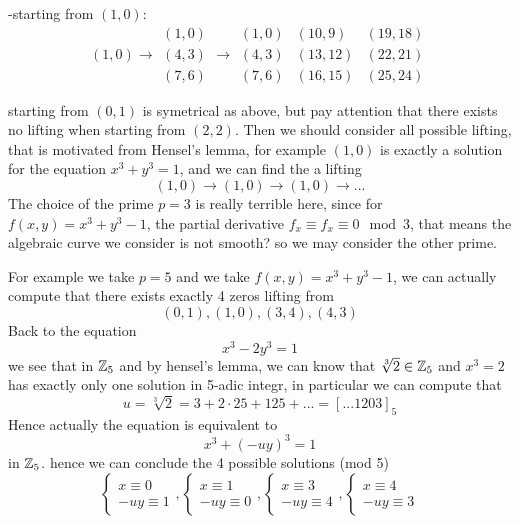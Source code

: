     -starting from \((1,0)\):
    \[(1,0) \rightarrow \begin{matrix}
        (1,0) \\
        (4,3) \\
        (7,6)
    \end{matrix} \rightarrow
    \begin{matrix}
        (1,0) & (10,9) & (19,18) \\
        (4,3) & (13,12) & (22,21) \\
        (7,6) & (16,15) & (25,24)
    \end{matrix}\]

    starting from \((0,1)\) is symetrical as above, but pay attention that there exists no lifting when starting from \((2,2)\). Then we should consider all possible lifting, that is motivated from Hensel's lemma, for example \((1,0)\) is exactly a solution for the equation \(x^3+y^3=1\), and we can find the a lifting
    \[(1,0) \rightarrow (1,0) \rightarrow (1,0) \rightarrow ...\]
    The choice of the prime \(p=3\) is really terrible here, since for \(f(x,y) = x^3+y^3-1\), the partial derivative \(f_x \equiv f_x \equiv 0 \mod 3\), that means the algebraic curve we consider is not smooth? so we may consider the other prime.

    For example we take \(p=5\) and we take \(f(x,y)=x^3+y^3-1\), we can actually compute that there exists exactly 4 zeros lifting from
    \[(0,1),(1,0),(3,4),(4,3)\]
    Back to the equation \[x^3-2y^3=1\] we see that in \(\mathbb{Z}_5\) and by hensel's lemma, we can know that \(\sqrt[3]{2} \in \mathbb{Z}_5\) and \(x^3=2\) has exactly only one solution in 5-adic integr, in particular we can compute that
    \[u = \sqrt[3]{2} = 3+2\cdot25+125+... = [...1203]_5\]
    Hence actually the equation is equivalent to
    \[x^3+(-uy)^3= 1\]
    in \(\mathbb{Z}_5\). hence we can conclude the 4 possible solutions (mod 5)
    \[\begin{cases}
        x \equiv 0\\
        -uy \equiv 1
    \end{cases},\begin{cases}
        x \equiv 1\\
        -uy \equiv 0
    \end{cases},\begin{cases}
        x \equiv 3\\
        -uy \equiv 4
    \end{cases},\begin{cases}
        x \equiv 4\\
        -uy \equiv 3
    \end{cases}\]


